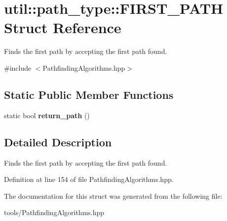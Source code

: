 \hypertarget{structutil_1_1path__type_1_1_f_i_r_s_t___p_a_t_h}{}\section{util\+:\+:path\+\_\+type\+:\+:F\+I\+R\+S\+T\+\_\+\+P\+A\+TH Struct Reference}
\label{structutil_1_1path__type_1_1_f_i_r_s_t___p_a_t_h}


Finds the first path by accepting the first path found.  




{\ttfamily \#include $<$Pathfinding\+Algorithms.\+hpp$>$}

\subsection*{Static Public Member Functions}
\begin{DoxyCompactItemize}
\item 
static bool {\bfseries return\+\_\+path} ()\hypertarget{structutil_1_1path__type_1_1_f_i_r_s_t___p_a_t_h_a89ad468d39aff4c8b18212a5f57cd90b}{}\label{structutil_1_1path__type_1_1_f_i_r_s_t___p_a_t_h_a89ad468d39aff4c8b18212a5f57cd90b}

\end{DoxyCompactItemize}


\subsection{Detailed Description}
Finds the first path by accepting the first path found. 

Definition at line 154 of file Pathfinding\+Algorithms.\+hpp.



The documentation for this struct was generated from the following file\+:\begin{DoxyCompactItemize}
\item 
tools/Pathfinding\+Algorithms.\+hpp\end{DoxyCompactItemize}
